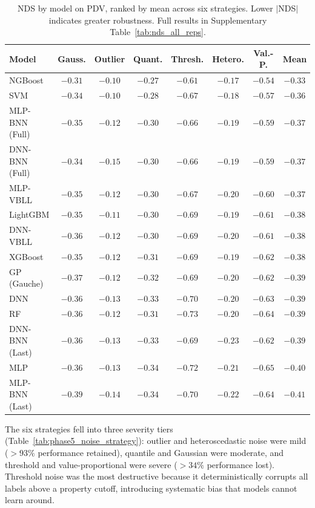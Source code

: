 \documentclass[pdflatex,sn-mathphys-num]{sn-jnl}%
\theoremstyle{thmstyleone}%
\theoremstyle{thmstyletwo}%
\theoremstyle{thmstylethree}%
\begin{document}
\begin{table}[htbp]
\centering
\caption{NDS by model on PDV, ranked by mean across six strategies. Lower $|$NDS$|$ indicates greater robustness. Full results in Supplementary Table~\ref{tab:nds_all_reps}.}
\label{tab:nds_ranking}
\small
\begin{tabular}{lccccccc}
\toprule
\textbf{Model} & \textbf{Gauss.} & \textbf{Outlier} & \textbf{Quant.} & \textbf{Thresh.} & \textbf{Hetero.} & \textbf{Val.-P.} & \textbf{Mean} \\
\midrule
NGBoost             & $-0.31$ & $-0.10$ & $-0.27$ & $-0.61$ & $-0.17$ & $-0.54$ & $-0.33$ \\
SVM                 & $-0.34$ & $-0.10$ & $-0.28$ & $-0.67$ & $-0.18$ & $-0.57$ & $-0.36$ \\
MLP-BNN (Full)      & $-0.35$ & $-0.12$ & $-0.30$ & $-0.66$ & $-0.19$ & $-0.59$ & $-0.37$ \\
DNN-BNN (Full)      & $-0.34$ & $-0.15$ & $-0.30$ & $-0.66$ & $-0.19$ & $-0.59$ & $-0.37$ \\
MLP-VBLL      & $-0.35$ & $-0.12$ & $-0.30$ & $-0.67$ & $-0.20$ & $-0.60$ & $-0.37$ \\
LightGBM            & $-0.35$ & $-0.11$ & $-0.30$ & $-0.69$ & $-0.19$ & $-0.61$ & $-0.38$ \\
DNN-VBLL      & $-0.36$ & $-0.12$ & $-0.30$ & $-0.69$ & $-0.20$ & $-0.61$ & $-0.38$ \\
XGBoost             & $-0.35$ & $-0.12$ & $-0.31$ & $-0.69$ & $-0.19$ & $-0.62$ & $-0.38$ \\
GP (Gauche)         & $-0.37$ & $-0.12$ & $-0.32$ & $-0.69$ & $-0.20$ & $-0.62$ & $-0.39$ \\
DNN                 & $-0.36$ & $-0.13$ & $-0.33$ & $-0.70$ & $-0.20$ & $-0.63$ & $-0.39$ \\
RF                  & $-0.36$ & $-0.12$ & $-0.31$ & $-0.73$ & $-0.20$ & $-0.64$ & $-0.39$ \\
DNN-BNN (Last)      & $-0.36$ & $-0.13$ & $-0.33$ & $-0.69$ & $-0.23$ & $-0.62$ & $-0.39$ \\
MLP                 & $-0.36$ & $-0.13$ & $-0.34$ & $-0.72$ & $-0.21$ & $-0.65$ & $-0.40$ \\
MLP-BNN (Last)      & $-0.39$ & $-0.14$ & $-0.34$ & $-0.70$ & $-0.22$ & $-0.64$ & $-0.41$ \\
\bottomrule
\end{tabular}
\end{table}

The six strategies fell into three severity tiers (Table~\ref{tab:phase5_noise_strategy}): outlier and heteroscedastic noise were mild ($>93\%$ performance retained), quantile and Gaussian were moderate, and threshold and value-proportional were severe ($>34\%$ performance lost). Threshold noise was the most destructive because it deterministically corrupts all labels above a property cutoff, introducing systematic bias that models cannot learn around.
\end{document}
